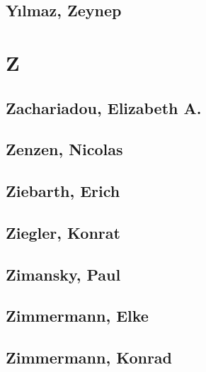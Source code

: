 \subsection[Yılmaz, Zeynep (1)]{Yılmaz, Zeynep}

\section{Z}

\subsection[Zachariadou, Elizabeth A. (1)]{Zachariadou, Elizabeth A.}

\subsection[Zenzen, Nicolas (1)]{Zenzen, Nicolas}

\subsection[Ziebarth, Erich (1)]{Ziebarth, Erich}

\subsection[Ziegler, Konrat (1)]{Ziegler, Konrat}

\subsection[Zimansky, Paul (1)]{Zimansky, Paul}

\subsection[Zimmermann, Elke (1)]{Zimmermann, Elke}

\subsection[Zimmermann, Konrad (2)]{Zimmermann, Konrad}


